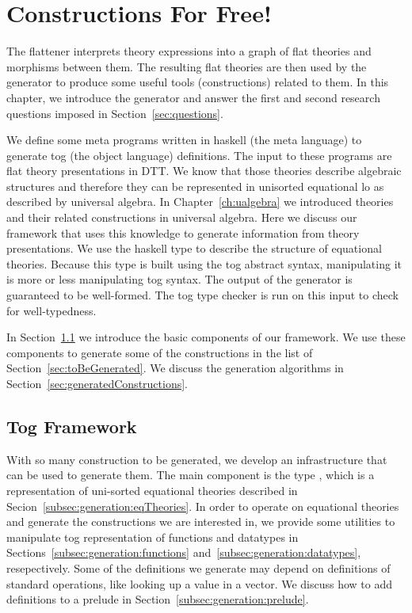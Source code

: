 \chapter{Constructions For Free!}
\label{ch:generation}

The flattener interprets theory expressions into a graph of flat theories and morphisms between them. The resulting flat theories are then used by the generator to produce some useful tools (constructions) related to them. In this chapter, we introduce the generator and answer the first and second research questions imposed in Section~\ref{sec:questions}.

We define some meta programs written in haskell (the meta language) to generate tog (the object language) definitions. 
The input to these programs are flat theory presentations in DTT. We know that those theories describe algebraic structures and therefore they can be represented in unisorted equational lo as described by universal algebra. In Chapter~\ref{ch:ualgebra} we introduced theories and their related constructions in universal algebra. Here we discuss our framework that uses this knowledge to generate information from theory presentations. We use the haskell type  to describe the structure of equational theories. Because this type is built using the tog abstract syntax, manipulating it is more or less manipulating tog syntax. The output of the generator is guaranteed to be well-formed. The tog type checker is run on this input to check for well-typedness. 

In Section~\ref{sec:togFamework} we introduce the basic components of our framework. We use these components to generate some of the constructions in the list of Section~\ref{sec:toBeGenerated}. We discuss the generation algorithms in Section~\ref{sec:generatedConstructions}. 

\section{Tog Framework}
\label{sec:togFamework}
With so many construction to be generated, we develop an infrastructure that can be used to generate them. The main component is the type , which is a representation of uni-sorted equational theories described in Secion~\ref{subsec:generation:eqTheories}. 
In order to operate on equational theories and generate the constructions we are interested in, we provide some utilities to manipulate tog representation of functions and datatypes in Sections~\ref{subsec:generation:functions} and~\ref{subsec:generation:datatypes}, resepectively. 
Some of the definitions we generate may depend on definitions of standard operations, like looking up a value in a vector. We discuss how to add definitions to a prelude in Section~\ref{subsec:generation:prelude}. 

